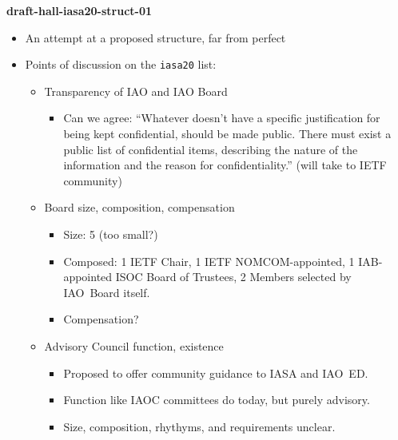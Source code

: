 \documentclass[helvetica]{seminar}
\newcommand{\heading}[1]{%
  \begin{center} 
    \large\bf 
    #1 
  \end{center} 
  \vspace{.4 in}}
\begin{document}
\begin{slide}

\heading{draft-hall-iasa20-struct-01}

{\footnotesize
\vspace{-8ex}
\begin{itemize}
\item An attempt at a proposed structure, far from perfect
\item Points of discussion on the \texttt{iasa20} list:
  \begin{itemize}
  \item Transparency of IAO and IAO Board
    \begin{itemize}
    \item Can we agree: ``Whatever doesn't have a specific
      justification for being kept confidential, should be made
      public.  There must exist a public list of confidential items,
      describing the nature of the information and the reason for
      confidentiality.'' (will take to IETF community)
    \end{itemize}
  \item Board size, composition, compensation
    \begin{itemize}
    \item Size: 5 (too small?)
    \item Composed: 1 IETF Chair, 1 IETF NOMCOM-appointed, 1
      IAB-appointed ISOC Board of Trustees, 2 Members selected by
      IAO~Board itself.
    \item Compensation?
    \end{itemize}
  \item Advisory Council function, existence
    \begin{itemize}
    \item Proposed to offer community guidance to IASA and IAO~ED.
    \item Function like IAOC committees do today, but purely advisory.
    \item Size, composition, rhythyms, and requirements unclear.
    \end{itemize}
  \end{itemize}
\end{itemize}
}
\end{slide}
\end{document}
